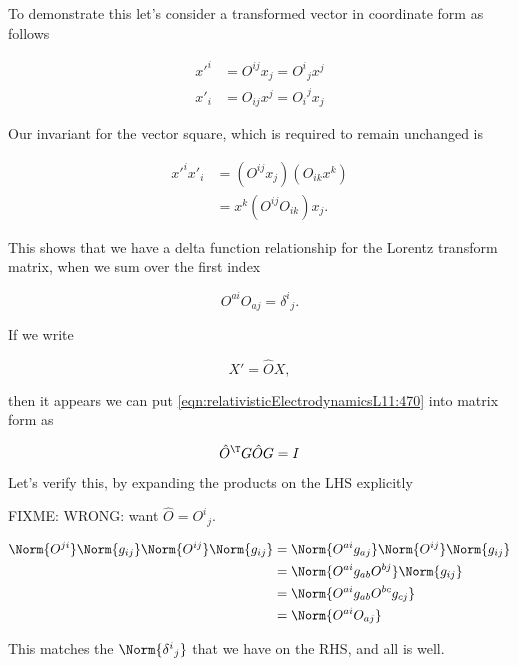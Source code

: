 To demonstrate this let's consider a transformed vector in coordinate form as follows

\begin{align}\label{eqn:relativisticElectrodynamicsL11:450}
{x'}^i &= O^{i j} x_j = {O^i}_j x^j \\
{x'}_i &= O_{i j} x^j = {O_i}^j x_j
\end{align}

Our invariant for the vector square, which is required to remain unchanged is

\begin{align*}
{x'}^i {x'}_i 
&= (O^{i j} x_j)(O_{i k} x^k) \\
&= x^k (O^{i j} O_{i k}) x_j.
\end{align*}

This shows that we have a delta function relationship for the Lorentz transform matrix, when we sum over the first index

\begin{equation}\label{eqn:relativisticElectrodynamicsL11:470}
O^{a i} O_{a j} = {\delta^i}_j.
\end{equation}

If we write 

\begin{equation}\label{eqn:relativisticElectrodynamicsL11:n}
X' = \hat{O} X,
\end{equation}

then it appears we can put \ref{eqn:relativisticElectrodynamicsL11:470} into matrix form as

\begin{equation}\label{eqn:relativisticElectrodynamicsL11:n}
\hat{O}^\T G \hat{O} G = I
\end{equation}

Let's verify this, by expanding the products on the LHS explicitly

FIXME: WRONG: want $\hat{O} = {O^i}_j$.

\begin{align*}
\Norm{O^{ji}} \Norm{ g_{ij} } \Norm{ O^{ij} } \Norm{ g_{ij} }
&=
\Norm{O^{a i} g_{aj} } \Norm{ O^{ij} } \Norm{ g_{ij} } \\
&=
\Norm{O^{a i} g_{a b} O^{b j} } \Norm{ g_{ij} } \\
&=
\Norm{ O^{a i} g_{a b} O^{b c} g_{c j} } \\
&=
\Norm{ O^{a i} O_{a j} }
\end{align*}

This matches the $\Norm{{\delta^i}_j}$ that we have on the RHS, and all is well.


